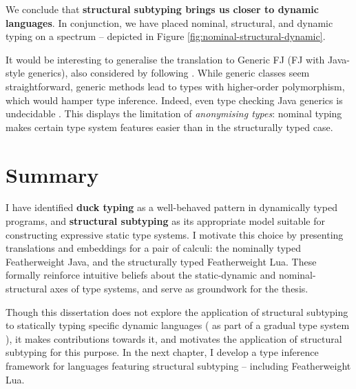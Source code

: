We conclude that \textbf{structural subtyping brings us closer to dynamic languages}. In conjunction, we have placed nominal, structural, and dynamic typing on a spectrum -- depicted in Figure \ref{fig:nominal-structural-dynamic}.

It would be interesting to generalise the translation to Generic FJ (FJ with Java-style generics), also considered by \textcite{featherweight-java} following \textcite{generic-java}. While generic classes seem straightforward, generic methods lead to types with higher-order polymorphism, which would hamper type inference. Indeed, even type checking Java generics is undecidable \cite{java-generics-undecidable}. This displays the limitation of \emph{anonymising types}: nominal typing makes certain type system features easier than in the structurally typed case.

\section{Summary}

I have identified \textbf{duck typing} as a well-behaved pattern in dynamically typed programs, and \textbf{structural subtyping} as its appropriate model suitable for constructing expressive static type systems. I motivate this choice by presenting translations and embeddings for a pair of calculi: the nominally typed Featherweight Java, and the structurally typed Featherweight Lua. These formally reinforce intuitive beliefs about the static-dynamic and nominal-structural axes of type systems, and serve as groundwork for the thesis.

Though this dissertation does not explore the application of structural subtyping to statically typing specific dynamic languages (\eg{} as part of a gradual type system \cite{gradual-typing-for-objects}), it makes contributions towards it, and motivates the application of structural subtyping for this purpose. In the next chapter, I develop a type inference framework for languages featuring structural subtyping -- including Featherweight Lua.


